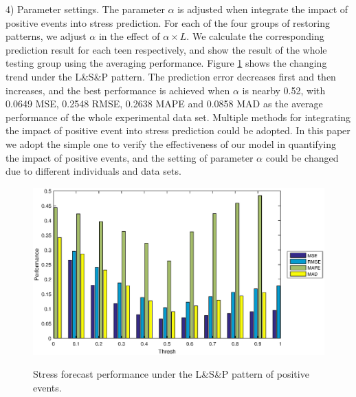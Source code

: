 4) Parameter settings.
The parameter $\alpha$ is adjusted when integrate the impact of positive events into stress prediction.
For each of the four groups of restoring patterns,
we adjust $\alpha$ in the effect of $\alpha \times L$.
We calculate the corresponding prediction result for each teen respectively,
and show the result of the whole testing group using the averaging performance.
Figure \ref{fig:thresh} shows the changing trend under the L\&S\&P pattern.
The prediction error decreases first and then increases,
and the best performance is achieved when $\alpha$ is nearby 0.52,
with 0.0649 MSE, 0.2548 RMSE, 0.2638 MAPE and 0.0858 MAD as the average performance of the whole experimental data set.
Multiple methods for integrating the impact of positive event into stress prediction could be adopted.
In this paper we adopt the simple one to verify the effectiveness of our model in quantifying the impact of positive events,
and the setting of parameter $\alpha$ could be changed due to different individuals and data sets.

\begin{figure}
\centering
\caption{Stress forecast performance under the L\&S\&P pattern of positive events.}
\includegraphics[width=0.9\linewidth]{figs/threshNew.eps}
\label{fig:thresh}
\end{figure}




